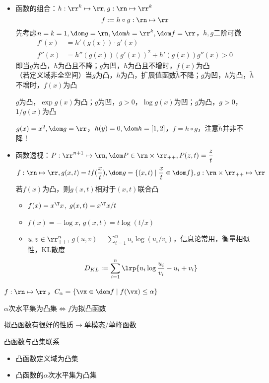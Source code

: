 \begin{itemize}
\begin{example}
	\end{example}
	\item 函数的组合：$h:\rr^k\mapsto\rr,g:\rn\mapsto\rr^k$
	\[f:=h\circ g:\rn\mapsto\rr\]
	先考虑$n=k=1,\dom g=\rn,\dom h=\rr^k,\dom f=\rr$，$h,g$二阶可微
	\[\begin{aligned}
	f'(x)&=h'(g(x))\cdot g'(x)\\
	f''(x)&=h''(g(x))(g'(x))^2+h'(g(x))g''(x)>0
	\end{aligned}\]
	即当$g$为凸，$h$为凸且不降；$g$为凹，$h$为凸且不增时，$f(x)$为凸\\
	（若定义域非全空间）当$g$为凸，$h$为凸，扩展值函数$\tilde{h}$不降；$g$为凹，$h$为凸，$\tilde{h}$不增时，$f(x)$为凸
	\begin{example}
	$g$为凸，$\exp g(x)$为凸；$g$为凹，$g>0$，$\log g(x)$为凹；$g$为凸，$g>0$，$1/g(x)$为凸
	\end{example}
	\begin{example}
	$g(x)=x^2,\dom g=\rr$，$h(y)=0,\dom h=[1,2]$，$f=h\circ g$，注意$\tilde{h}$并非不降！
	\end{example}
	\item 函数透视：$P:\rr^{n+1}\mapsto\rn,\dom P\in\rn\times\rr_{++},P(z,t)=\dfrac{z}{t}$ %
	\[f:\rn\mapsto\rr,g(x,t)=tf(\frac{x}{t}),\dom g=\{(x,t)\mid\frac{x}{t}\in\dom f\},g:\rn\times\rr_{++}\mapsto\rr\]
	若$f(x)$为凸，则$g(x,t)$相对于$(x,t)$联合凸 %
	\begin{example}
	\begin{itemize}
		\item $f(x)=x^\T x$, $g(x,t)=x^\T x/t$
		\item $f(x)=-\log x$, $g(x,t)=t\log(t/x)$
		\item $u,v\in\rr_{++}^n$, $g(u,v)=\sum_{i=1}^nu_i\log(u_i/v_i)$，信息论常用，衡量相似性，KL散度
		\[D_{KL}:=\sum_{i=1}^n\lrp{u_i\log\frac{u_i}{v_i}-u_i+v_i}\]
	\end{itemize}
	\end{example}
\end{itemize}

\begin{definition}
$f:\rn\mapsto\rr$，$C_\alpha=\{\vx\in\dom f\mid f(\vx)\leq\alpha\}$
\end{definition}
\begin{definition}
$\alpha$次水平集为凸集$\iff$$f$为拟凸函数
\end{definition}
拟凸函数有很好的性质$\to$单模态/单峰函数

凸函数与凸集联系
\begin{itemize}
	\item 凸函数定义域为凸集
	\item 凸函数的$\alpha$次水平集为凸集
\end{itemize}